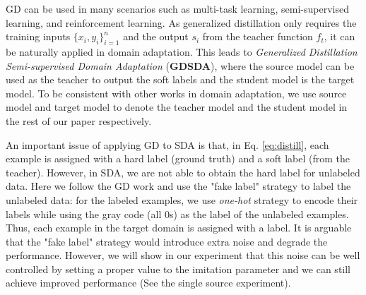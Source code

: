 GD can be used in many scenarios such as multi-task learning, semi-supervised learning, and reinforcement learning. As generalized distillation only requires the training inputs $\{x_i,y_i\}_{i=1}^n$ and the output $s_i$ from the teacher function $f_t$, it can be naturally applied in domain adaptation. This leads to \textit{Generalized Distillation Semi-supervised Domain Adaptation} (\textbf{GDSDA}), where the source model can be used as the teacher to output the soft labels and the student model is the target model. To be consistent with other works in domain adaptation, we use source model and target model to denote the teacher model and the student model in the rest of our paper respectively.

An important issue of applying GD to SDA is that, in Eq. \eqref{eq:distill}, each example is assigned with a hard label (ground truth) and a soft label (from the teacher). However, in SDA, we are not able to obtain the hard label for unlabeled data. Here we follow the GD work\cite{lopez2015unifying} and use the "fake label" strategy to label the unlabeled data: for the labeled examples, we use \textit{one-hot} strategy to encode their labels while using the gray code (all 0s) as the label of the unlabeled examples. Thus, each example in the target domain is assigned with a label. It is arguable that the "fake label" strategy would introduce extra noise and degrade the performance. However, we will show in our experiment that this noise can be well controlled by setting a proper value to the imitation parameter and we can still achieve improved performance (See the single source experiment).

